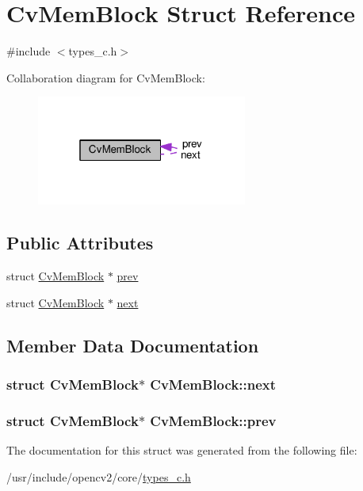 \hypertarget{structCvMemBlock}{\section{Cv\-Mem\-Block Struct Reference}
\label{structCvMemBlock}
}


{\ttfamily \#include $<$types\-\_\-c.\-h$>$}



Collaboration diagram for Cv\-Mem\-Block\-:\nopagebreak
\begin{figure}[H]
\begin{center}
\leavevmode
\includegraphics[width=196pt]{structCvMemBlock__coll__graph}
\end{center}
\end{figure}
\subsection*{Public Attributes}
\begin{DoxyCompactItemize}
\item 
struct \hyperlink{structCvMemBlock}{Cv\-Mem\-Block} $\ast$ \hyperlink{structCvMemBlock_ab8e8c1c2858bd1c898cf3e2a98ce14a6}{prev}
\item 
struct \hyperlink{structCvMemBlock}{Cv\-Mem\-Block} $\ast$ \hyperlink{structCvMemBlock_a83b0c9d5a0790935a438b5c2ba12d510}{next}
\end{DoxyCompactItemize}


\subsection{Member Data Documentation}
\hypertarget{structCvMemBlock_a83b0c9d5a0790935a438b5c2ba12d510}{
\subsubsection[{next}]{\setlength{\rightskip}{0pt plus 5cm}struct {\bf Cv\-Mem\-Block}$\ast$ Cv\-Mem\-Block\-::next}}\label{structCvMemBlock_a83b0c9d5a0790935a438b5c2ba12d510}
\hypertarget{structCvMemBlock_ab8e8c1c2858bd1c898cf3e2a98ce14a6}{
\subsubsection[{prev}]{\setlength{\rightskip}{0pt plus 5cm}struct {\bf Cv\-Mem\-Block}$\ast$ Cv\-Mem\-Block\-::prev}}\label{structCvMemBlock_ab8e8c1c2858bd1c898cf3e2a98ce14a6}


The documentation for this struct was generated from the following file\-:\begin{DoxyCompactItemize}
\item 
/usr/include/opencv2/core/\hyperlink{core_2types__c_8h}{types\-\_\-c.\-h}\end{DoxyCompactItemize}
